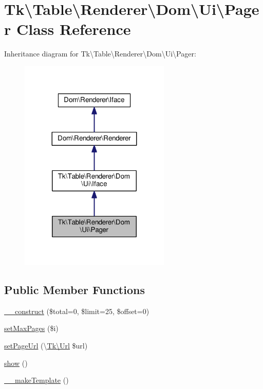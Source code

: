 \hypertarget{classTk_1_1Table_1_1Renderer_1_1Dom_1_1Ui_1_1Pager}{\section{Tk\textbackslash{}Table\textbackslash{}Renderer\textbackslash{}Dom\textbackslash{}Ui\textbackslash{}Pager Class Reference}
\label{classTk_1_1Table_1_1Renderer_1_1Dom_1_1Ui_1_1Pager}
}


Inheritance diagram for Tk\textbackslash{}Table\textbackslash{}Renderer\textbackslash{}Dom\textbackslash{}Ui\textbackslash{}Pager\+:\nopagebreak
\begin{figure}[H]
\begin{center}
\leavevmode
\includegraphics[width=203pt]{classTk_1_1Table_1_1Renderer_1_1Dom_1_1Ui_1_1Pager__inherit__graph}
\end{center}
\end{figure}
\subsection*{Public Member Functions}
\begin{DoxyCompactItemize}
\item 
\hyperlink{classTk_1_1Table_1_1Renderer_1_1Dom_1_1Ui_1_1Pager_a46db9684333cc9217a5264f08dd75c6c}{\+\_\+\+\_\+construct} (\$total=0, \$limit=25, \$offset=0)
\item 
\hyperlink{classTk_1_1Table_1_1Renderer_1_1Dom_1_1Ui_1_1Pager_a4bdbcafbc61ab0bd7346b161e5b5e042}{set\+Max\+Pages} (\$i)
\item 
\hyperlink{classTk_1_1Table_1_1Renderer_1_1Dom_1_1Ui_1_1Pager_a4ba75bdebd9e465a9fc9f619b79da75c}{set\+Page\+Url} (\textbackslash{}\hyperlink{classTk_1_1Url}{Tk\textbackslash{}\+Url} \$url)
\item 
\hyperlink{classTk_1_1Table_1_1Renderer_1_1Dom_1_1Ui_1_1Pager_ae40067db74fa55f76345f0ba9eef3f56}{show} ()
\item 
\hyperlink{classTk_1_1Table_1_1Renderer_1_1Dom_1_1Ui_1_1Pager_a47327878cd7fc65bb1f6b40138ce0853}{\+\_\+\+\_\+make\+Template} ()
\end{DoxyCompactItemize}
